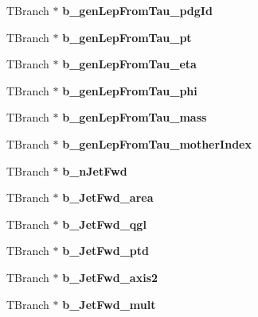 \begin{DoxyCompactItemize}
T\+Branch $\ast$ {\bfseries b\+\_\+gen\+Lep\+From\+Tau\+\_\+pdg\+Id}
\item 
\hypertarget{classMiniTree_aedc7945cc0f830c3aa811ea06a40e544}{}\label{classMiniTree_aedc7945cc0f830c3aa811ea06a40e544} 
T\+Branch $\ast$ {\bfseries b\+\_\+gen\+Lep\+From\+Tau\+\_\+pt}
\item 
\hypertarget{classMiniTree_a72af064cd34fd32e9dd00699a47eb70e}{}\label{classMiniTree_a72af064cd34fd32e9dd00699a47eb70e} 
T\+Branch $\ast$ {\bfseries b\+\_\+gen\+Lep\+From\+Tau\+\_\+eta}
\item 
\hypertarget{classMiniTree_a10ca04f0feafbd39383f8fc8e622890c}{}\label{classMiniTree_a10ca04f0feafbd39383f8fc8e622890c} 
T\+Branch $\ast$ {\bfseries b\+\_\+gen\+Lep\+From\+Tau\+\_\+phi}
\item 
\hypertarget{classMiniTree_a155abccf06e104f9d334630d78aa3c92}{}\label{classMiniTree_a155abccf06e104f9d334630d78aa3c92} 
T\+Branch $\ast$ {\bfseries b\+\_\+gen\+Lep\+From\+Tau\+\_\+mass}
\item 
\hypertarget{classMiniTree_a56bf0f4229fb1de8a6833263b961ab32}{}\label{classMiniTree_a56bf0f4229fb1de8a6833263b961ab32} 
T\+Branch $\ast$ {\bfseries b\+\_\+gen\+Lep\+From\+Tau\+\_\+mother\+Index}
\item 
\hypertarget{classMiniTree_ace4400de1838a004ab25cd2b20beb6af}{}\label{classMiniTree_ace4400de1838a004ab25cd2b20beb6af} 
T\+Branch $\ast$ {\bfseries b\+\_\+n\+Jet\+Fwd}
\item 
\hypertarget{classMiniTree_a3a1a90a8bb2263e7aa3d637c89ae1769}{}\label{classMiniTree_a3a1a90a8bb2263e7aa3d637c89ae1769} 
T\+Branch $\ast$ {\bfseries b\+\_\+\+Jet\+Fwd\+\_\+area}
\item 
\hypertarget{classMiniTree_a9cce5ba033d4b0623bd9d215311844c6}{}\label{classMiniTree_a9cce5ba033d4b0623bd9d215311844c6} 
T\+Branch $\ast$ {\bfseries b\+\_\+\+Jet\+Fwd\+\_\+qgl}
\item 
\hypertarget{classMiniTree_ae5ed4daab99a3f099ea63a96e9f23d95}{}\label{classMiniTree_ae5ed4daab99a3f099ea63a96e9f23d95} 
T\+Branch $\ast$ {\bfseries b\+\_\+\+Jet\+Fwd\+\_\+ptd}
\item 
\hypertarget{classMiniTree_a73ba438994b4c3d2fa8075dde14d2094}{}\label{classMiniTree_a73ba438994b4c3d2fa8075dde14d2094} 
T\+Branch $\ast$ {\bfseries b\+\_\+\+Jet\+Fwd\+\_\+axis2}
\item 
\hypertarget{classMiniTree_a21eea25962287c89c685323d01a511bb}{}\label{classMiniTree_a21eea25962287c89c685323d01a511bb} 
T\+Branch $\ast$ {\bfseries b\+\_\+\+Jet\+Fwd\+\_\+mult}
\item 

\end{DoxyCompactItemize}

